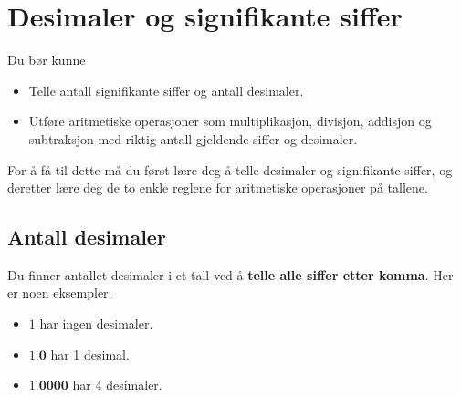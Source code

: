 \documentclass[a4paper,9pt]{article}
\begin{document}






\pagebreak

\section{Desimaler og signifikante siffer}


\vspace{.5cm}

Du bør kunne

\begin{itemize}
\item Telle antall signifikante siffer og antall desimaler.
\item Utføre aritmetiske operasjoner som multiplikasjon, divisjon, addisjon og subtraksjon med riktig antall gjeldende siffer og desimaler.
\end{itemize}

For å få til dette må du først lære deg å telle desimaler og signifikante siffer, og deretter lære deg de to enkle reglene for aritmetiske operasjoner på tallene.

\subsection{Antall desimaler}

Du finner antallet desimaler i et tall ved å \textbf{telle alle siffer etter komma}. Her er noen eksempler:

\begin{itemize}
\item $1$ har ingen desimaler.
\item $1.\mathbf{0}$ har 1 desimal. 
\item $1.\mathbf{0000}$ har 4 desimaler. 
\end{itemize}
\end{document}
